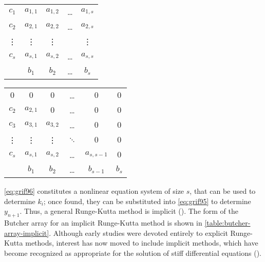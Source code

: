 \noindent\begin{minipage}[t]{0.5\textwidth}%
    \centering
    \label{table:butcher-array-implicit}
    \begin{tabular}{c|cccc}
        $c_1$  & $a_{1,1}$ & $a_{1,2}$ & \dots & $a_{1,s}$ \\
        $c_2$  & $a_{2,1}$ & $a_{2,2}$ & \dots & $a_{2,s}$ \\
        \vdots & \vdots    & \vdots    &       & \vdots \\ 
        $c_s$  & $a_{s,1}$ & $a_{s,2}$ & \dots & $a_{s,s}$ \\
        \hline
               & $b_1$     & $b_2$     & \dots & $b_s$ \\
    \end{tabular}
    \captionsetup{width=0.8\linewidth}
\end{minipage}%
\begin{minipage}[t]{0.5\textwidth}%
    \centering
    \label{table:butcher-array-explicit}
    \begin{tabular}{c|ccccc}
        $0$    & $0$       & $0$       & \dots  & $0$         & $0$ \\
        $c_2$  & $a_{2,1}$ & $0$       & \dots  & $0$         & $0$ \\
        $c_3$  & $a_{3,1}$ & $a_{3,2}$ & \dots  & $0$         & $0$ \\
        \vdots & \vdots    & \vdots    & $\ddots$ & $0$         & $0$ \\ 
        $c_s$  & $a_{s,1}$ & $a_{s,2}$ & \dots  & $a_{s,s-1}$ & $0$ \\
        \hline
               & $b_1$     & $b_2$     & \dots & $b_{s-1}$    & $b_s$ \\
    \end{tabular}
    \captionsetup{width=0.8\linewidth}
\end{minipage}%

\autoref{eq:grif96} constitutes a nonlinear equation system of size $s$, that can 
be used to determine $k_i$; once found, they can be substituted into \autoref{eq:grif95} 
to determine $y_{n+1}$. Thus, a general Runge-Kutta method is implicit (\cite{Griffiths2010}).
The form of the Butcher array for an implicit Runge-Kutta method is shown in 
\autoref{table:butcher-array-implicit}. Although early studies were devoted entirely 
to explicit Runge-Kutta methods, interest has now moved to include implicit methods, 
which have become recognized as appropriate for the solution of stiff differential 
equations (\cite{Butcher2016}).

